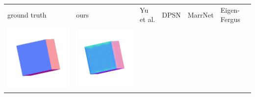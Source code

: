 \begin{tabularx}{\linewidth}{@{}Y@{}Y@{}Y@{}Y@{}Y@{}Y@{}}
ground truth & ours & Yu et al. & DPSN & MarrNet & Eigen-Fergus \\
\includegraphics[width=\linewidth]{semisynthetic/20150514_0_gt.png} &
\includegraphics[width=\linewidth]{semisynthetic/20150514_0_ours_out.png} &

\end{tabularx}
